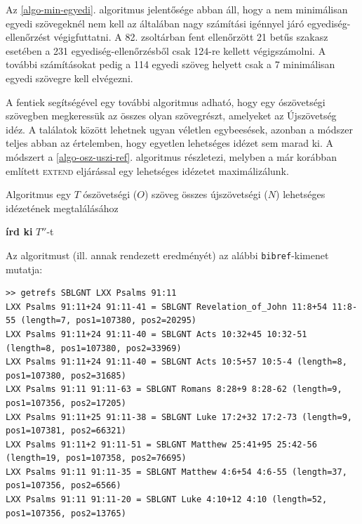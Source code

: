 \documentclass{article}
\begin{document}
Az \ref{algo-min-egyedi}. algoritmus jelentősége abban áll, hogy a nem minimálisan egyedi
szövegeknél nem kell az általában nagy számítási igénnyel járó egyediség-ellenőrzést
végigfuttatni. A 82. zsoltárban fent ellenőrzött 21 betűs szakasz esetében a 231 egyediség-ellenőrzésből
csak 124-re kellett végigszámolni. A további számításokat pedig a 114 egyedi szöveg helyett
csak a 7 minimálisan egyedi szövegre kell elvégezni.

A fentiek segítségével egy további algoritmus adható, hogy egy ószövetségi szövegben megkeressük
az összes olyan szövegrészt, amelyeket az Újszövetség idéz. A találatok között lehetnek
ugyan véletlen egybeesések, azonban a módszer teljes abban az értelemben, hogy egyetlen
lehetséges idézet sem marad ki. A módszert a \ref{algo-osz-uszi-ref}. algoritmus részletezi, melyben a már korábban
említett \textsc{extend} eljárással egy lehetséges idézetet maximálizálunk.

\begin{algorithm}
\caption{Algoritmus egy $T$ ószövetségi ($O$) szöveg összes
újszövetségi ($N$) lehetséges idézetének megtalálásához}
\label{algo-osz-uszi-ref}
\begin{algorithmic}[1]
         \State \textbf{írd ki} {$T''$}-t
        \EndIf
       \EndFor
      \EndFor
    \EndIf
   \EndFor
  \EndFor
 \EndFor
\EndProcedure
\end{algorithmic}
\end{algorithm}

Az algoritmust (ill. annak rendezett eredményét) az alábbi \texttt{bibref}-kimenet mutatja:

\begin{lstlisting}
>> getrefs SBLGNT LXX Psalms 91:11
LXX Psalms 91:11+24 91:11-41 = SBLGNT Revelation_of_John 11:8+54 11:8-55 (length=7, pos1=107380, pos2=20295)
LXX Psalms 91:11+24 91:11-40 = SBLGNT Acts 10:32+45 10:32-51 (length=8, pos1=107380, pos2=33969)
LXX Psalms 91:11+24 91:11-40 = SBLGNT Acts 10:5+57 10:5-4 (length=8, pos1=107380, pos2=31685)
LXX Psalms 91:11 91:11-63 = SBLGNT Romans 8:28+9 8:28-62 (length=9, pos1=107356, pos2=17205)
LXX Psalms 91:11+25 91:11-38 = SBLGNT Luke 17:2+32 17:2-73 (length=9, pos1=107381, pos2=66321)
LXX Psalms 91:11+2 91:11-51 = SBLGNT Matthew 25:41+95 25:42-56 (length=19, pos1=107358, pos2=76695)
LXX Psalms 91:11 91:11-35 = SBLGNT Matthew 4:6+54 4:6-55 (length=37, pos1=107356, pos2=6566)
LXX Psalms 91:11 91:11-20 = SBLGNT Luke 4:10+12 4:10 (length=52, pos1=107356, pos2=13765)
\end{lstlisting}
\end{document}
